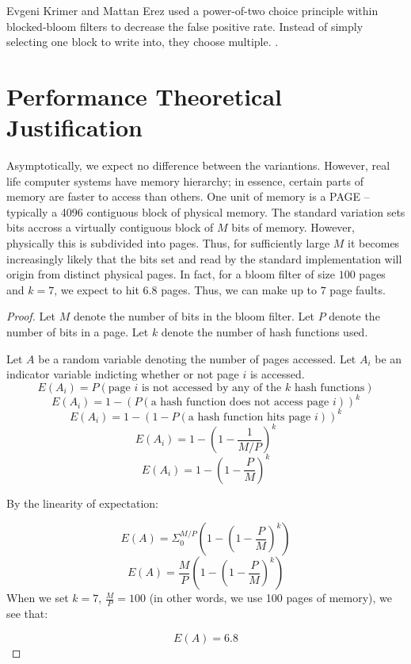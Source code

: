 \documentclass[a4paper]{article}
\theoremstyle{plain}
\theoremstyle{definition}
\begin{document}
	Evgeni Krimer and Mattan Erez used a power-of-two choice principle within blocked-bloom filters to decrease the false positive rate.
	Instead of simply selecting one block to write into, they choose multiple.
	\cite{Krimer}.

	\section{Performance Theoretical Justification}
	Asymptotically, we expect no difference between the variantions.
	However, real life computer systems have memory hierarchy;
	in essence, certain parts of memory are faster to access than others.
	One unit of memory is a PAGE -- typically a 4096 contiguous block of physical memory.
	The standard variation sets bits accross a virtually contiguous block of $M$ bits of memory.
	However, physically this is subdivided into pages. 
	Thus, for sufficiently large $M$ it becomes increasingly likely that the bits set and read by the standard implementation will origin from distinct physical pages.
	In fact, for a bloom filter of size $100$ pages and $k=7$, we expect to hit $6.8$ pages. Thus, we can make up to $7$ page faults.
	
	
	\begin{proof}
		Let $M$ denote the number of bits in the bloom filter. 
		Let $P$ denote the number of bits in a page. 
		Let $k$ denote the number of hash functions used.

		Let $A$ be a random variable denoting the number of pages accessed.
		Let $A_i$ be an indicator variable indicting whether or not page $i$ is accessed.
		$$E(A_i) = P(\text{page $i$ is not accessed by any of the $k$ hash functions})$$
		$$E(A_i) = 1 - (P(\text{a hash function does not access page $i$}))^k$$
		$$E(A_i) = 1 - (1-P(\text{a hash function hits page $i$}))^k$$
		$$E(A_i) = 1 - (1-\frac{1}{M/P})^k$$
		$$E(A_i) = 1 - (1-\frac{P}{M})^k$$

		By the linearity of expectation:
		
		$$E(A) = \Sigma_0^{M/P} (1 - (1-\frac{P}{M})^k)$$
		$$E(A) = \frac{M}{P}(1 - (1-\frac{P}{M})^k)$$
		When we set $k=7$, $\frac{M}{P} = 100$ (in other words, we use 100 pages of memory), we see that:

		$$E(A) = 6.8$$



	\end{proof}
\end{document}
